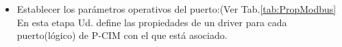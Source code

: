 \begin{itemize}
  \item Establecer los parámetros operativos del puerto:(Ver 
    Tab.\ref{tab:PropModbus}\\
    En esta etapa Ud. define las propiedades de un driver para cada 
    puerto(lógico) de P-CIM con el que está asociado.
\end{itemize}
